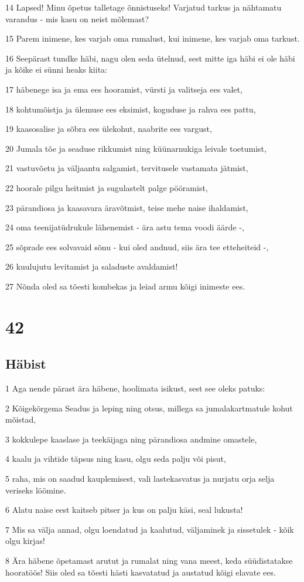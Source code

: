\par 14 Lapsed! Minu õpetus talletage õnnistuseks! Varjatud tarkus ja nähtamatu varandus - mis kasu on neist mõlemast?
\par 15 Parem inimene, kes varjab oma rumalust, kui inimene, kes varjab oma tarkust.
\par 16 Seepärast tundke häbi, nagu olen seda ütelnud, sest mitte iga häbi ei ole häbi ja kõike ei sünni heaks kiita:
\par 17 häbenege isa ja ema ees hooramist, vürsti ja valitseja ees valet,
\par 18 kohtumõistja ja ülemuse ees eksimist, koguduse ja rahva ees pattu,
\par 19 kaasosalise ja sõbra ees ülekohut, naabrite ees vargust,
\par 20 Jumala tõe ja seaduse rikkumist ning küünarnukiga leivale toetumist,
\par 21 vastuvõetu ja väljaantu salgamist, tervitusele vastamata jätmist,
\par 22 hoorale pilgu heitmist ja sugulastelt palge pööramist,
\par 23 pärandiosa ja kaasavara äravõtmist, teise mehe naise ihaldamist,
\par 24 oma teenijatüdrukule lähenemist - ära astu tema voodi äärde -,
\par 25 sõprade ees solvavaid sõnu - kui oled andnud, siis ära tee etteheiteid -,
\par 26 kuulujutu levitamist ja saladuste avaldamist!
\par 27 Nõnda oled sa tõesti kombekas ja leiad armu kõigi inimeste ees.

\chapter{42}

\section*{Häbist}

\par 1 Aga nende pärast ära häbene, hoolimata isikust, sest see oleks patuks:
\par 2 Kõigekõrgema Seadus ja leping ning otsus, millega sa jumalakartmatule kohut mõistad,
\par 3 kokkulepe kaaslase ja teekäijaga ning pärandiosa andmine omastele,
\par 4 kaalu ja vihtide täpsus ning kasu, olgu seda palju või pisut,
\par 5 raha, mis on saadud kauplemisest, vali lastekasvatus ja nurjatu orja selja veriseks löömine.
\par 6 Alatu naise eest kaitseb pitser ja kus on palju käsi, seal lukusta!
\par 7 Mis sa välja annad, olgu loendatud ja kaalutud, väljaminek ja sissetulek - kõik olgu kirjas!
\par 8 Ära häbene õpetamast arutut ja rumalat ning vana meest, keda süüdistatakse hooratöös! Siis oled sa tõesti hästi kasvatatud ja austatud kõigi elavate ees.


